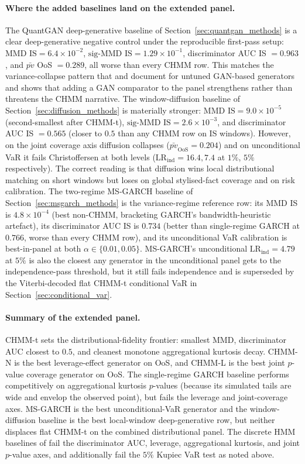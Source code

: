 \paragraph{Where the added baselines land on the extended panel.}
The QuantGAN deep-generative baseline of Section~\ref{sec:quantgan_methods} is a clear deep-generative negative control under the reproducible first-pass setup: $\text{MMD IS} = 6.4 \times 10^{-2}$, $\text{sig-MMD IS} = 1.29 \times 10^{-1}$, discriminator AUC IS $= 0.963$, and $\bar{pv}$ OoS $= 0.289$, all worse than every CHMM row.
This matches the variance-collapse pattern that \citet{kwon2024can} and \citet{takahashi2019modeling} document for untuned GAN-based generators and shows that adding a GAN comparator to the panel strengthens rather than threatens the CHMM narrative.
The window-diffusion baseline of Section~\ref{sec:diffusion_methods} is materially stronger: $\text{MMD IS} = 9.0 \times 10^{-5}$ (second-smallest after CHMM-t), $\text{sig-MMD IS} = 2.6 \times 10^{-3}$, and discriminator AUC IS $= 0.565$ (closer to $0.5$ than any CHMM row on IS windows).
However, on the joint coverage axis diffusion collapses ($\bar{pv}_{\text{OoS}} = 0.204$) and on unconditional VaR it fails Christoffersen at both levels ($\text{LR}_{\text{ind}} = 16.4, 7.4$ at $1\%$, $5\%$ respectively).
The correct reading is that diffusion wins local distributional matching on short windows but loses on global stylised-fact coverage and on risk calibration.
The two-regime MS-GARCH baseline of Section~\ref{sec:msgarch_methods} is the variance-regime reference row: its MMD IS is $4.8 \times 10^{-4}$ (best non-CHMM, bracketing GARCH's bandwidth-heuristic artefact), its discriminator AUC IS is $0.734$ (better than single-regime GARCH at $0.766$, worse than every CHMM row), and its unconditional VaR calibration is best-in-panel at both $\alpha \in \{0.01, 0.05\}$.
MS-GARCH's unconditional $\text{LR}_{\text{ind}} = 4.79$ at $5\%$ is also the closest any generator in the unconditional panel gets to the independence-pass threshold, but it still fails independence and is superseded by the Viterbi-decoded flat CHMM-t conditional VaR in Section~\ref{sec:conditional_var}.

\paragraph{Summary of the extended panel.}
CHMM-t sets the distributional-fidelity frontier: smallest MMD, discriminator AUC closest to $0.5$, and cleanest monotone aggregational kurtosis decay.
CHMM-N is the best leverage-effect generator on OoS, and CHMM-L is the best joint $p$-value coverage generator on OoS.
The single-regime GARCH baseline performs competitively on aggregational kurtosis $p$-values (because its simulated tails are wide and envelop the observed point), but fails the leverage and joint-coverage axes.
MS-GARCH is the best unconditional-VaR generator and the window-diffusion baseline is the best local-window deep-generative row, but neither displaces flat CHMM-t on the combined distributional panel.
The discrete HMM baselines of \citet{alswaidan2026hybrid} fail the discriminator AUC, leverage, aggregational kurtosis, and joint $p$-value axes, and additionally fail the $5\%$ Kupiec VaR test as noted above.

